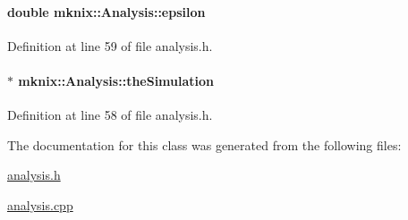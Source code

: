 \paragraph[{epsilon}]{\setlength{\rightskip}{0pt plus 5cm}double mknix\+::\+Analysis\+::epsilon\hspace{0.3cm}{\ttfamily [protected]}}\label{classmknix_1_1_analysis_a7e0439caf5fa5f90d808acec6d75b72f}


Definition at line 59 of file analysis.\+h.

\hypertarget{classmknix_1_1_analysis_a1abc29e3b8565590b6bf0ce2d8b3b68f}{}
\paragraph[{the\+Simulation}]{$\ast$ mknix\+::\+Analysis\+::the\+Simulation\hspace{0.3cm}{\ttfamily [protected]}}\label{classmknix_1_1_analysis_a1abc29e3b8565590b6bf0ce2d8b3b68f}


Definition at line 58 of file analysis.\+h.



The documentation for this class was generated from the following files\+:\begin{DoxyCompactItemize}
\item 
\hyperlink{analysis_8h}{analysis.\+h}\item 
\hyperlink{analysis_8cpp}{analysis.\+cpp}\end{DoxyCompactItemize}
